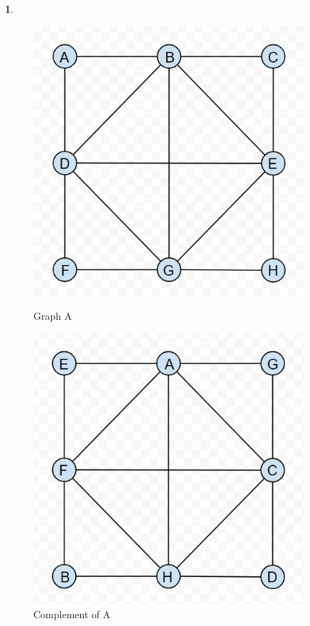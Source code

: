 \documentclass[12pt,a4paper]{article}
\theoremstyle{definition}
\newtheorem{problem}{}
\begin{document}
\begin{problem}
\begin{figure}[H]
    \centering
    \begin{minipage}{0.5\textwidth}
        \centering
        \includegraphics[width=0.9\textwidth]{q4a.png} %
        \caption{Graph A}
    \end{minipage}\hfill
    \begin{minipage}{0.5\textwidth}
        \centering
        \includegraphics[width=0.9\textwidth]{q4b.png} %
        \caption{Complement of A}
    \end{minipage}
\end{figure}

\end{problem}
\end{document}
